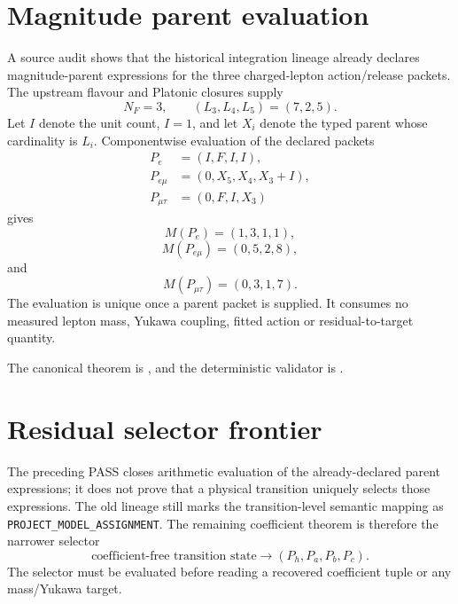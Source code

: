 \section{Magnitude parent evaluation}
A source audit shows that the historical integration lineage already declares
magnitude-parent expressions for the three charged-lepton action/release
packets. The upstream flavour and Platonic closures supply
\begin{equation}
\boxed{N_F=3,\qquad (L_3,L_4,L_5)=(7,2,5).}
\label{eq:v12-magnitude-upstream-integers}
\end{equation}
Let $I$ denote the unit count, $I=1$, and let $X_i$ denote the typed parent
whose cardinality is $L_i$. Componentwise evaluation of the declared packets
\begin{align}
P_e&=(I,F,I,I),\\
P_{e\mu}&=(0,X_5,X_4,X_3+I),\\
P_{\mu\tau}&=(0,F,I,X_3)
\end{align}
gives
\begin{equation}
\boxed{M(P_e)=(1,3,1,1),}
\label{eq:v12-magnitude-electron}
\end{equation}
\begin{equation}
\boxed{M(P_{e\mu})=(0,5,2,8),}
\label{eq:v12-magnitude-emu}
\end{equation}
and
\begin{equation}
\boxed{M(P_{\mu\tau})=(0,3,1,7).}
\label{eq:v12-magnitude-mutau}
\end{equation}
The evaluation is unique once a parent packet is supplied. It consumes no
measured lepton mass, Yukawa coupling, fitted action or residual-to-target
quantity.

The canonical theorem is
,
and the deterministic validator is
.

\section{Residual selector frontier}
The preceding PASS closes arithmetic evaluation of the already-declared parent
expressions; it does not prove that a physical transition uniquely selects those
expressions. The old lineage still marks the transition-level semantic mapping
as \texttt{PROJECT\_MODEL\_ASSIGNMENT}. The remaining coefficient theorem is
therefore the narrower selector
\begin{equation}
\boxed{
\text{coefficient-free transition state}
\longrightarrow
(P_h,P_a,P_b,P_c).
}
\label{eq:v12-coefficient-parent-selector}
\end{equation}
The selector must be evaluated before reading a recovered coefficient tuple or
any mass/Yukawa target.

